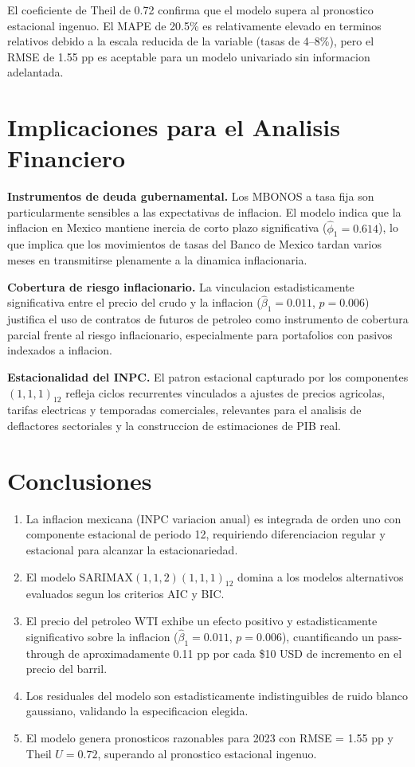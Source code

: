 \documentclass[12pt,a4paper]{article}
\begin{document}
El coeficiente de Theil de 0.72 confirma que el modelo supera al pronostico estacional ingenuo. El MAPE de 20.5\% es relativamente elevado en terminos relativos debido a la escala reducida de la variable (tasas de 4--8\%), pero el RMSE de 1.55 pp es aceptable para un modelo univariado sin informacion adelantada.

\section{Implicaciones para el Analisis Financiero}

\textbf{Instrumentos de deuda gubernamental.} Los MBONOS a tasa fija son particularmente sensibles a las expectativas de inflacion. El modelo indica que la inflacion en Mexico mantiene inercia de corto plazo significativa ($\hat{\phi}_1 = 0.614$), lo que implica que los movimientos de tasas del Banco de Mexico tardan varios meses en transmitirse plenamente a la dinamica inflacionaria.

\textbf{Cobertura de riesgo inflacionario.} La vinculacion estadisticamente significativa entre el precio del crudo y la inflacion ($\hat{\beta}_1 = 0.011$, $p = 0.006$) justifica el uso de contratos de futuros de petroleo como instrumento de cobertura parcial frente al riesgo inflacionario, especialmente para portafolios con pasivos indexados a inflacion.

\textbf{Estacionalidad del INPC.} El patron estacional capturado por los componentes $(1,1,1)_{12}$ refleja ciclos recurrentes vinculados a ajustes de precios agricolas, tarifas electricas y temporadas comerciales, relevantes para el analisis de deflactores sectoriales y la construccion de estimaciones de PIB real.

\section{Conclusiones}

\begin{enumerate}[label=\arabic*.]
  \item La inflacion mexicana (INPC variacion anual) es integrada de orden uno con componente estacional de periodo 12, requiriendo diferenciacion regular y estacional para alcanzar la estacionariedad.
  \item El modelo SARIMAX$(1,1,2)(1,1,1)_{12}$ domina a los modelos alternativos evaluados segun los criterios AIC y BIC.
  \item El precio del petroleo WTI exhibe un efecto positivo y estadisticamente significativo sobre la inflacion ($\hat{\beta}_1 = 0.011$, $p=0.006$), cuantificando un pass-through de aproximadamente 0.11 pp por cada \$10 USD de incremento en el precio del barril.
  \item Los residuales del modelo son estadisticamente indistinguibles de ruido blanco gaussiano, validando la especificacion elegida.
  \item El modelo genera pronosticos razonables para 2023 con RMSE = 1.55 pp y Theil $U = 0.72$, superando al pronostico estacional ingenuo.
\end{enumerate}
\end{document}
